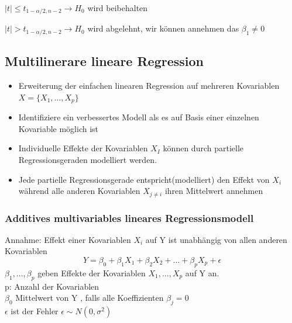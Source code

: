 $|t| \leq  t_{1-\alpha/2, n-2} \rightarrow H_0$ wird beibehalten

$|t| >  t_{1-\alpha/2, n-2} \rightarrow H_0$ wird abgelehnt, wir können annehmen das $\beta_1 \neq 0$

\subsection{Multilinerare lineare Regression}
\begin{itemize}
	\item Erweiterung der einfachen linearen Regression auf mehreren Kovariablen $X=\{{X_1, \ldots, X_p}\}$
	\item Identifiziere ein verbessertes Modell als es auf Basis einer einzelnen Kovariable möglich ist 
	\item Individuelle Effekte der Kovariablen $X_I$ können durch partielle Regressionsgeraden modelliert werden.
	\item Jede partielle Regressionsgerade entspricht(modelliert) den Effekt von $X_i$ während alle anderen Kovariablen $X_{j \neq i}$ ihren Mittelwert annehmen
\end{itemize}

\subsubsection{Additives multivariables lineares Regressionsmodell}
Annahme: Effekt einer Kovariablen $X_i$ auf Y ist unabhängig von allen anderen Kovariablen 
\[Y = \beta_0 + \beta_1X_1 + \beta_2X_2 + \ldots + \beta_p X_p + \epsilon\]
$ \beta_1,\ldots,\beta_p$ geben Effekte der Kovariablen $X_1, \ldots, X_p$ auf Y an.\\
p: Anzahl der Kovariablen\\ 
$ \beta_0 $ Mittelwert von Y , falls alle Koeffizienten $ \beta_j = 0 $\\
$\epsilon$ ist der Fehler $\epsilon \sim N(0, \sigma^2)$





